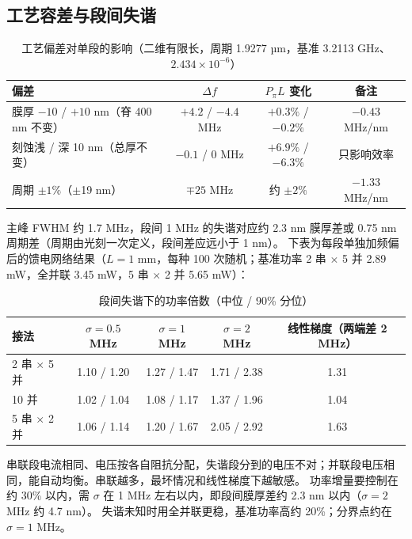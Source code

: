 \documentclass[10pt,a4paper]{article}
\begin{document}
\subsection{工艺容差与段间失谐}\label{sec:tol}
\begin{table}[H]
\centering\small
\caption{工艺偏差对单段的影响（二维有限长，周期 1.9277 µm，基准 3.2113 GHz、$2.434\times10^{-6}$）}
\begin{tabular}{L{6.0cm}ccc}
\toprule
偏差 & $\Delta f$ & $P_\pi L$ 变化 & 备注 \\
\midrule
膜厚 $-10$ / $+10$ nm（脊 400 nm 不变） & $+4.2$ / $-4.4$ MHz & $+0.3\%$ / $-0.2\%$ & $-0.43$ MHz/nm \\
刻蚀浅 / 深 10 nm（总厚不变） & $-0.1$ / $0$ MHz & $+6.9\%$ / $-6.3\%$ & 只影响效率 \\
周期 $\pm1\%$（$\pm$19 nm） & $\mp25$ MHz & 约 $\pm2\%$ & $-1.33$ MHz/nm \\
\bottomrule
\end{tabular}
\end{table}

主峰 FWHM 约 1.7 MHz，段间 1 MHz 的失谐对应约 2.3 nm 膜厚差或 0.75 nm 周期差（周期由光刻一次定义，段间差应远小于 1 nm）。
下表为每段单独加频偏后的馈电网络结果（$L = 1$ mm，每种 100 次随机；基准功率 2 串 $\times$ 5 并 2.89 mW，全并联 3.45 mW，5 串 $\times$ 2 并 5.65 mW）：

\begin{table}[H]
\centering\small
\caption{段间失谐下的功率倍数（中位 / 90\% 分位）}
\begin{tabular}{L{3.2cm}cccc}
\toprule
接法 & $\sigma = 0.5$ MHz & $\sigma = 1$ MHz & $\sigma = 2$ MHz & 线性梯度（两端差 2 MHz） \\
 串 $\times$ 5 并 & 1.10 / 1.20 & 1.27 / 1.47 & 1.71 / 2.38 & 1.31 \\
10 并 & 1.02 / 1.04 & 1.08 / 1.17 & 1.37 / 1.96 & 1.04 \\
5 串 $\times$ 2 并 & 1.06 / 1.14 & 1.20 / 1.67 & 2.05 / 2.92 & 1.63 \\
\bottomrule
\end{tabular}
\end{table}

串联段电流相同、电压按各自阻抗分配，失谐段分到的电压不对；并联段电压相同，能自动均衡。串联越多，最坏情况和线性梯度下越敏感。
功率增量要控制在约 30\% 以内，需 $\sigma$ 在 1 MHz 左右以内，即段间膜厚差约 2.3 nm 以内（$\sigma = 2$ MHz 约 4.7 nm）。
失谐未知时用全并联更稳，基准功率高约 20\%；分界点约在 $\sigma = 1$ MHz。
\end{document}

